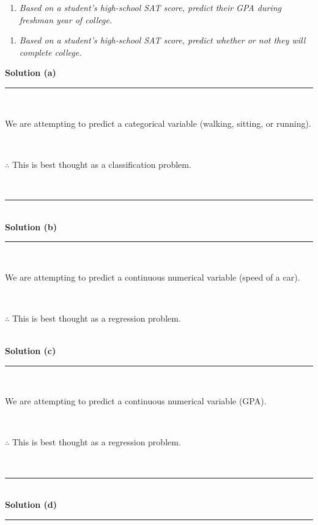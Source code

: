 \documentclass{article}
\begin{document}
\begin{enumerate}[label=(c)]
  \item \textit{Based on a student's high-school SAT score, predict their GPA during freshman year of college.}
\end{enumerate}

\begin{enumerate}[label=(d)]
  \item \textit{Based on a student's high-school SAT score, predict whether or not they will complete college.}
\end{enumerate}

\textbf{Solution (a)}

\noindent\rule{\textwidth}{0.4pt}\\

\parbox{\textwidth}{We are attempting to predict a categorical variable (walking, sitting, or running).}\\

\parbox{\textwidth}{$\therefore$ This is best thought as a classification problem.}\\

\noindent\rule{\textwidth}{0.4pt}\\

\textbf{Solution (b)}

\noindent\rule{\textwidth}{0.4pt}\\

\parbox{\textwidth}{We are attempting to predict a continuous numerical variable (speed of a car).}\\

\parbox{\textwidth}{$\therefore$ This is best thought as a regression problem.}\\

\textbf{Solution (c)}

\noindent\rule{\textwidth}{0.4pt}\\

\parbox{\textwidth}{We are attempting to predict a continuous numerical variable (GPA).}\\

\parbox{\textwidth}{$\therefore$ This is best thought as a regression problem.}\\

\noindent\rule{\textwidth}{0.4pt}\\

\textbf{Solution (d)}

\noindent\rule{\textwidth}{0.4pt}\\
\end{document}
